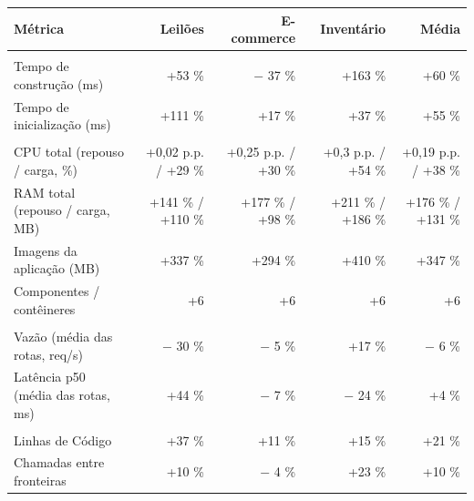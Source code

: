 \begin{quadro}[htb]
  \centering
  \caption{Variação acumulada por aplicação --- Subdomínio (DDD).}
  \label{qua:comp_subdominio_variacoes}
  \renewcommand{\arraystretch}{1.15}
  \setlength{\tabcolsep}{3pt}
  \footnotesize
  \begin{tabularx}{\textwidth}{|>{\raggedright\arraybackslash}X|r|r|r|r|}
    \hline
    \textbf{Métrica} & \textbf{Leilões} & \textbf{E-commerce} & \textbf{Inventário} & \textbf{Média} \\
    \hline
    \multicolumn{5}{|l|}{\textbf{Agilidade}} \\
    \hline
    Tempo de construção (ms) & +53 \% & $-$ 37 \% & +163 \% & +60 \% \\
    Tempo de inicialização (ms) & +111 \% & +17 \% & +37 \% & +55 \% \\
    \hline
    \multicolumn{5}{|l|}{\textbf{Custo}} \\
    \hline
    CPU total (repouso / carga, \%) & +0,02 p.p. / +29 \% & +0,25 p.p. / +30 \% & +0,3 p.p. / +54 \% & +0,19 p.p. / +38 \% \\
    RAM total (repouso / carga, MB) & +141 \% / +110 \% & +177 \% / +98 \% & +211 \% / +186 \% & +176 \% / +131 \% \\
    Imagens da aplicação (MB) & +337 \% & +294 \% & +410 \% & +347 \% \\
    Componentes / contêineres & +6 & +6 & +6 & +6 \\
    \hline
    \multicolumn{5}{|l|}{\textbf{Desempenho}} \\
    \hline
    Vazão (média das rotas, req/s) & $-$ 30 \% & $-$ 5 \% & +17 \% & $-$ 6 \% \\
    Latência p50 (média das rotas, ms) & +44 \% & $-$ 7 \% & $-$ 24 \% & +4 \% \\
    \hline
    \multicolumn{5}{|l|}{\textbf{Manutenibilidade}} \\
    \hline
    Linhas de Código & +37 \% & +11 \% & +15 \% & +21 \% \\
    Chamadas entre fronteiras & +10 \% & $-$ 4 \% & +23 \% & +10 \% \\
    \hline
  \end{tabularx}
\end{quadro}
